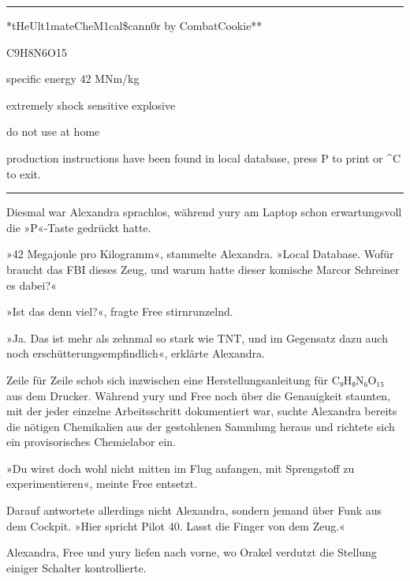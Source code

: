 \noindent \parbox{\textwidth}{ \vspace{3ex} \hrule \vspace{3ex}

    \begin{footnotesize}
    \begin{ttfamily}

\noindent **tHeUlt1mateCheM1cal\$cann0r by CombatCookie**

\noindent C9H8N6O15

\noindent specific energy 42 MNm/kg

\noindent extremely shock sensitive explosive

\noindent do not use at home

\noindent production instructions have been found in local database, press P to print or \^{}C to exit.

    \end{ttfamily}
    \end{footnotesize}

\vspace{3ex} \hrule \vspace{3ex} }

Diesmal war Alexandra sprachlos, während yury am Laptop schon erwartungsvoll die »P«-Taste gedrückt hatte.

»42 Megajoule pro Kilogramm«, stammelte Alexandra. »Local Database. Wofür braucht das FBI dieses Zeug, und warum hatte dieser komische Marcor Schreiner es dabei?«

»Ist das denn viel?«, fragte Free stirnrunzelnd.

»Ja. Das ist mehr als zehnmal so stark wie TNT, und im Gegensatz dazu auch noch erschütterungsempfindlich«, erklärte Alexandra.

Zeile für Zeile schob sich inzwischen eine Herstellungsanleitung für C₉H₈N₆O₁₅ aus dem Drucker. Während yury und Free noch über die Genauigkeit staunten, mit der jeder einzelne Arbeitsschritt dokumentiert war, suchte Alexandra bereits die nötigen Chemikalien aus der gestohlenen Sammlung heraus und richtete sich ein provisorisches Chemielabor ein.

»Du wirst doch wohl nicht mitten im Flug anfangen, mit Sprengstoff zu experimentieren«, meinte Free entsetzt.

Darauf antwortete allerdings nicht Alexandra, sondern jemand über Funk aus dem Cockpit. »Hier spricht Pilot 40. Lasst die Finger von dem Zeug.«

Alexandra, Free und yury liefen nach vorne, wo Orakel verdutzt die Stellung einiger Schalter kontrollierte.

